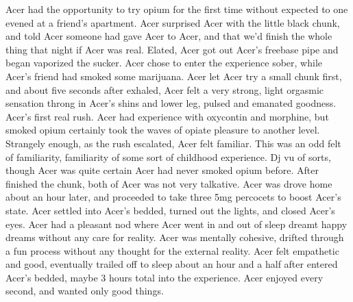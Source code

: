 \documentclass[12pt]{book}
\begin{document}
Acer had the opportunity to try opium for the first time without expected to one evened at a friend's apartment. Acer surprised Acer with the little black chunk, and told Acer someone had gave Acer to Acer, and that we'd finish the whole thing that night if Acer was real. Elated, Acer got out Acer's freebase pipe and began vaporized the sucker. Acer chose to enter the experience sober, while Acer's friend had smoked some marijuana. Acer let Acer try a small chunk first, and about five seconds after exhaled, Acer felt a very strong, light orgasmic sensation throng in Acer's shins and lower leg, pulsed and emanated goodness. Acer's first real rush. Acer had experience with oxycontin and morphine, but smoked opium certainly took the waves of opiate pleasure to another level. Strangely enough, as the rush escalated, Acer felt familiar. This was an odd felt of familiarity, familiarity of some sort of childhood experience. Dj vu of sorts, though Acer was quite certain Acer had never smoked opium before. After finished the chunk, both of Acer was not very talkative. Acer was drove home about an hour later, and proceeded to take three 5mg percocets to boost Acer's state. Acer settled into Acer's bedded, turned out the lights, and closed Acer's eyes. Acer had a pleasant nod where Acer went in and out of sleep dreamt happy dreams without any care for reality. Acer was mentally cohesive, drifted through a fun process without any thought for the external reality. Acer felt empathetic and good, eventually trailed off to sleep about an hour and a half after entered Acer's bedded, maybe 3 hours total into the experience. Acer enjoyed every second, and wanted only good things.
\end{document}
